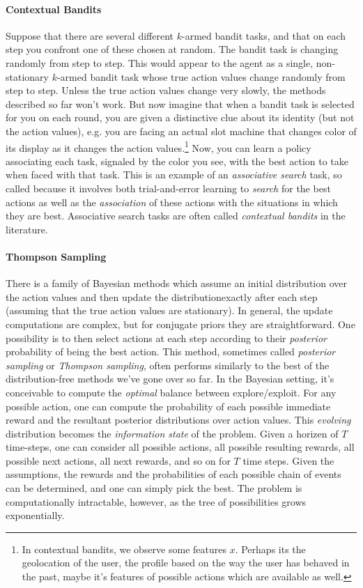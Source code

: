 \documentclass[12pt]{article}
\begin{document}
\paragraph{Contextual Bandits}
Suppose that there are several different $k$-armed bandit tasks, and that on each step you confront one of these chosen at random. The bandit task is changing randomly from step to step. This would appear to the agent as a single, non-stationary $k$-armed bandit task whose true action values change randomly from step to step. Unless the true action values change very slowly, the methods described so far won't work. But now imagine that when a bandit task is selected for you on each round, you are given a distinctive clue about its identity (but not the action values), e.g. you are facing an actual slot machine that changes color of its display as it changes the action values.\footnote{In contextual bandits, we observe some features  $x$. Perhaps its the geolocation of the user, the profile based on the way the  user has behaved in the past, maybe it's features of possible actions which are available as well.} Now, you can learn a policy associating each task, signaled by the color you see, with the best action to take when faced with that task. This is an example of an \emph{associative search} task, so called because it involves both trial-and-error learning to \emph{search} for the best actions as well as the \emph{association} of these actions with the situations in which they are best.
Associative search tasks are often called \emph{contextual bandits} in the literature.

\paragraph{Thompson Sampling} There is a family of Bayesian methods which assume an initial distribution over the action values and then update the distributionexactly after each step (assuming that the true action values are stationary). In general, the update computations are complex, but for conjugate priors they are straightforward. One possibility is to then select actions at each step according to their \emph{posterior} probability of being the best action. This method, sometimes called \emph{posterior sampling} or \emph{Thompson sampling}, often performs similarly to the best of the distribution-free methods we've gone over so far. In the Bayesian setting, it's conceivable to compute the \emph{optimal} balance between explore/exploit. For any possible action, one can compute the probability of each possible immediate reward and the resultant posterior distributions over action values. This \emph{evolving} distribution becomes the \emph{information state} of the problem. Given a horizen of $T$ time-steps, one can consider all possible actions, all possible resulting rewards, all possible next actions, all next rewards, and so on for $T$ time steps. Given the assumptions, the rewards and the probabilities of each possible chain of events can be determined, and one can simply pick the best. The problem is computationally intractable, however, as the tree of possibilities grows exponentially.
\end{document}
